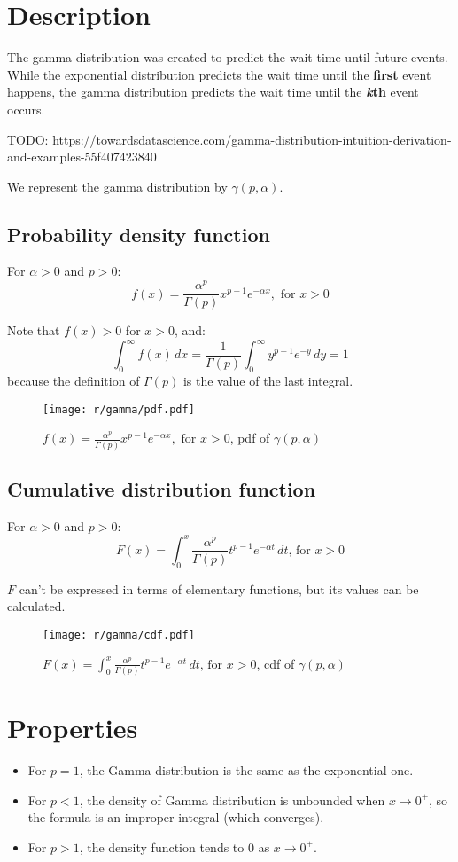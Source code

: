 \section{Description}

The gamma distribution was created to predict the wait time until future events. While the exponential distribution
predicts the wait time until the \textbf{first} event happens, the gamma distribution predicts the wait time until the
\textbf{\textit{k}th} event occurs.

TODO: https://towardsdatascience.com/gamma-distribution-intuition-derivation-and-examples-55f407423840

We represent the gamma distribution by $\gamma(p, \alpha)$.

\subsection{Probability density function}
For $\alpha > 0$ and $p > 0$:
\[
	f(x) = \frac{\alpha^p}{\Gamma(p)} x^{p - 1} e^{-\alpha x}, \text{ for } x > 0
\]

Note that $f(x) > 0$ for $x > 0$, and:
\[
	\int_0^\infty f(x) \, dx = \frac{1}{\Gamma(p)} \int_0^\infty y^{p - 1} e^{-y} \, dy= 1
\]
because the definition of $\Gamma(p)$ is the value of the last integral.

\begin{figure}[H]
	\texttt{[image: r/gamma/pdf.pdf]}
	\caption{$f(x) = \frac{\alpha^p}{\Gamma(p)} x^{p - 1} e^{-\alpha x}, \text{ for } x > 0$, pdf of $\gamma(p, \alpha)$}
\end{figure}


\subsection{Cumulative distribution function}
For $\alpha > 0$ and $p > 0$:
\[
	F(x) = \int_0^x \frac{\alpha^p}{\Gamma(p)} t^{p - 1} e^{-\alpha t} \, dt \text{, for } x > 0
\]

$F$ can't be expressed in terms of elementary functions, but its values can be calculated.

\begin{figure}[H]
	\texttt{[image: r/gamma/cdf.pdf]}
	\caption{$F(x) = \int_0^x \frac{\alpha^p}{\Gamma(p)} t^{p - 1} e^{-\alpha t} \, dt \text{, for } x > 0$, cdf of $\gamma(p, \alpha)$}
\end{figure}

\section{Properties}
\begin{itemize}
	\item For $p = 1$, the Gamma distribution is the same as the exponential one.
	\item For $p < 1$, the density of Gamma distribution is unbounded when $x \rightarrow 0^+$, so the formula is an improper integral (which converges).
	\item For $p > 1$, the density function tends to 0 as $x \rightarrow 0^+$.
\end{itemize}

